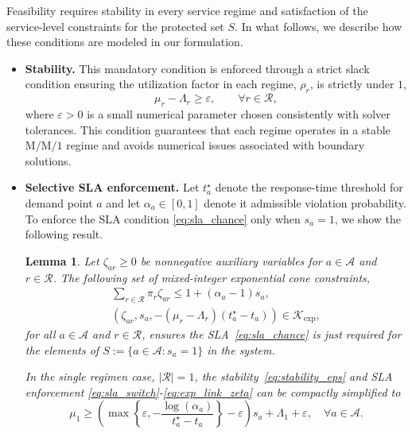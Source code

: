 \documentclass[letter,11pt, reqno]{amsart}
\newtheorem{lemma}{Lemma}
\def\A{\mathcal{A}}
\def\RR{\mathcal{R}}
\begin{document}
\noindent Feasibility requires stability in every service regime and satisfaction of the
service-level constraints for the protected set $S$. In what follows, we describe how these conditions are modeled in our formulation.
\begin{itemize}
\item[-] \textbf{Stability.}
This mandatory condition is enforced through a strict slack condition ensuring the utilization factor in each regime, $\rho_r$, is strictly under $1$,
\begin{equation}
\mu_r - \Lambda_r \ge \varepsilon,
\qquad \forall r\in\mathcal{R},
\label{eq:stability_eps}
\end{equation}
where $\varepsilon>0$ is a small numerical parameter chosen consistently with
solver tolerances. This condition guarantees that each regime operates in a
stable $\mathrm{M}/\mathrm{M}/1$ regime and avoids numerical issues associated
with boundary solutions.

\item[-] \textbf{Selective SLA enforcement.}
Let $t_a^\star$ denote the response-time threshold for demand point $a$ and let
$\alpha_a\in[0,1]$ denote it admissible violation probability. To enforce the SLA
condition \eqref{eq:sla_chance} only when $s_a=1$, we show the following result.

\begin{lemma}\label{lemma:sla}
    Let $\zeta_{ar}\geq 0$ be nonnegative auxiliary variables for $a\in \A$ and $r\in\RR$. The following set of mixed-integer exponential cone constraints,
    \begin{gather}
        \sum_{r\in\mathcal{R}} \pi_r \zeta_{ar}\le 1 + (\alpha_a-1)s_a,\label{eq:sla_switch}\\
        (\zeta_{ar}, s_a, -(\mu_r-\Lambda_r)(t_a^\star-t_a))\in \mathcal{K}_{\exp}, \label{eq:exp_link_zeta}
    \end{gather}
for all $a\in\A$ and $r\in\RR$, ensures the {\rm SLA}~\eqref{eq:sla_chance} is just required for the elements of $S := \{a \in \A: s_a=1\}$ in the system.

In the single regimen case, $|\RR|=1$, the stability~\eqref{eq:stability_eps} and {\rm SLA} enforcement \eqref{eq:sla_switch}-\eqref{eq:exp_link_zeta} can be compactly simplified to
$$
\mu_1 \geq  \left(\max\left\{\varepsilon, - \frac{\log(\alpha_a)}{t_a^\star-t_a}\right\} - \varepsilon\right) s_a + \Lambda_1 + \varepsilon, \quad \forall a \in \A.
$$
\end{lemma}


\end{itemize}
\end{document}
